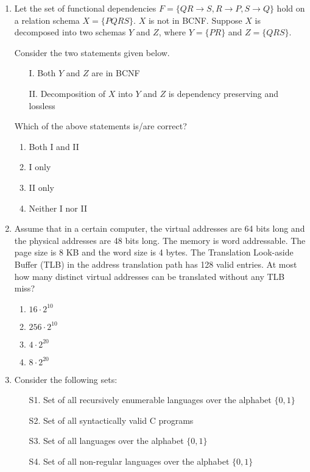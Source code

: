 \documentclass[12pt]{article}
\begin{document}
\begin{enumerate}[label=Q.\arabic*]
\item Let the set of functional dependencies $F = \{QR \rightarrow S, R \rightarrow P, S \rightarrow Q\}$ hold on a relation schema $X = \{PQRS\}$. $X$ is not in BCNF. Suppose $X$ is decomposed into two schemas $Y$ and $Z$, where $Y = \{PR\}$ and $Z = \{QRS\}$.

Consider the two statements given below.
\begin{enumerate}
\item[I.] Both $Y$ and $Z$ are in BCNF
\item[II.] Decomposition of $X$ into $Y$ and $Z$ is dependency preserving and lossless
\end{enumerate}

Which of the above statements is/are correct?
\begin{enumerate}[label=(\Alph*)]
\item Both I and II
\item I only
\item II only
\item Neither I nor II
\end{enumerate}

\item Assume that in a certain computer, the virtual addresses are 64 bits long and the physical addresses are 48 bits long. The memory is word addressable. The page size is 8 KB and the word size is 4 bytes. The Translation Look-aside Buffer (TLB) in the address translation path has 128 valid entries. At most how many distinct virtual addresses can be translated without any TLB miss?
\begin{enumerate}[label=(\Alph*)]
\item $16 \cdot 2^{10}$
\item $256 \cdot 2^{10}$
\item $4 \cdot 2^{20}$
\item $8 \cdot 2^{20}$
\end{enumerate}

\item Consider the following sets:
\begin{itemize}
\item[S1.] Set of all recursively enumerable languages over the alphabet $\{0,1\}$
\item[S2.] Set of all syntactically valid C programs
\item[S3.] Set of all languages over the alphabet $\{0,1\}$
\item[S4.] Set of all non-regular languages over the alphabet $\{0,1\}$
\end{itemize}


\end{enumerate}
\end{document}
